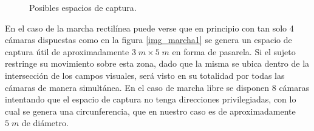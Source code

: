  
\begin{figure}[!ht]
  \centering
   \hspace{0.2cm}
     \caption{Posibles espacios de captura.}
  \label{img_espacio_capura}
\end{figure} 
 
En el caso de la marcha rectilínea puede verse que en principio con tan solo 4 cámaras dispuestas como en la figura \ref{img_marcha1} se genera un espacio de captura útil de aproximadamente $3\;m\times5\; m$ en forma de pasarela. Si el sujeto restringe su movimiento sobre esta zona, dado que la misma se ubica dentro de la intersección de los campos visuales, será visto en su totalidad por todas las cámaras de manera simultánea. En el caso de marcha libre se disponen 8 cámaras intentando que el espacio de captura no tenga direcciones privilegiadas, con lo cual se genera una circunferencia, que en nuestro caso es de aproximadamente $5\;m$ de diámetro. 


